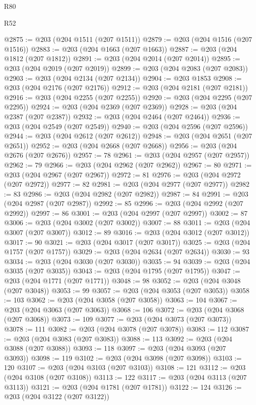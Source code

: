 \begin{lexlean}{R80}
\begin{lexlean}{R52}
\begin{coremodule}
{{{{{{{{{{{{{{{{{{{{{{{{{{{{{{{{{{{{{{{{{{{{{{{{{{{{{{{{{{{{{{{{{{{{{{{{{{{{{{{{{{{{{{{{{{{{{{{{{{{{{{{{{{{{{{{{{{{{{{{{{{{{{{{{{{{{{{{{{{{{{{{{{{{{{{{{{{{{{{{{{{{{{{{{{{{{{{{{{{{{{{{{{{{{{{{{{{{{{{@2875 := @203 (@204 @1511 (@207 @1511))
@2879 := @203 (@204 @1516 (@207 @1516))
@2883 := @203 (@204 @1663 (@207 @1663))
@2887 := @203 (@204 @1812 (@207 @1812))
@2891 := @203 (@204 @2014 (@207 @2014))
@2895 := @203 (@204 @2019 (@207 @2019))
@2899 := @203 (@204 @2083 (@207 @2083))
@2903 := @203 (@204 @2134 (@207 @2134))
@2904 := @203 @1853
@2908 := @203 (@204 @2176 (@207 @2176))
@2912 := @203 (@204 @2181 (@207 @2181))
@2916 := @203 (@204 @2255 (@207 @2255))
@2920 := @203 (@204 @2295 (@207 @2295))
@2924 := @203 (@204 @2369 (@207 @2369))
@2928 := @203 (@204 @2387 (@207 @2387))
@2932 := @203 (@204 @2464 (@207 @2464))
@2936 := @203 (@204 @2549 (@207 @2549))
@2940 := @203 (@204 @2596 (@207 @2596))
@2944 := @203 (@204 @2612 (@207 @2612))
@2948 := @203 (@204 @2651 (@207 @2651))
@2952 := @203 (@204 @2668 (@207 @2668))
@2956 := @203 (@204 @2676 (@207 @2676))
@2957 := 78
@2961 := @203 (@204 @2957 (@207 @2957))
@2962 := 79
@2966 := @203 (@204 @2962 (@207 @2962))
@2967 := 80
@2971 := @203 (@204 @2967 (@207 @2967))
@2972 := 81
@2976 := @203 (@204 @2972 (@207 @2972))
@2977 := 82
@2981 := @203 (@204 @2977 (@207 @2977))
@2982 := 83
@2986 := @203 (@204 @2982 (@207 @2982))
@2987 := 84
@2991 := @203 (@204 @2987 (@207 @2987))
@2992 := 85
@2996 := @203 (@204 @2992 (@207 @2992))
@2997 := 86
@3001 := @203 (@204 @2997 (@207 @2997))
@3002 := 87
@3006 := @203 (@204 @3002 (@207 @3002))
@3007 := 88
@3011 := @203 (@204 @3007 (@207 @3007))
@3012 := 89
@3016 := @203 (@204 @3012 (@207 @3012))
@3017 := 90
@3021 := @203 (@204 @3017 (@207 @3017))
@3025 := @203 (@204 @1757 (@207 @1757))
@3029 := @203 (@204 @2634 (@207 @2634))
@3030 := 93
@3034 := @203 (@204 @3030 (@207 @3030))
@3035 := 94
@3039 := @203 (@204 @3035 (@207 @3035))
@3043 := @203 (@204 @1795 (@207 @1795))
@3047 := @203 (@204 @1771 (@207 @1771))
@3048 := 98
@3052 := @203 (@204 @3048 (@207 @3048))
@3053 := 99
@3057 := @203 (@204 @3053 (@207 @3053))
@3058 := 103
@3062 := @203 (@204 @3058 (@207 @3058))
@3063 := 104
@3067 := @203 (@204 @3063 (@207 @3063))
@3068 := 106
@3072 := @203 (@204 @3068 (@207 @3068))
@3073 := 109
@3077 := @203 (@204 @3073 (@207 @3073))
@3078 := 111
@3082 := @203 (@204 @3078 (@207 @3078))
@3083 := 112
@3087 := @203 (@204 @3083 (@207 @3083))
@3088 := 113
@3092 := @203 (@204 @3088 (@207 @3088))
@3093 := 118
@3097 := @203 (@204 @3093 (@207 @3093))
@3098 := 119
@3102 := @203 (@204 @3098 (@207 @3098))
@3103 := 120
@3107 := @203 (@204 @3103 (@207 @3103))
@3108 := 121
@3112 := @203 (@204 @3108 (@207 @3108))
@3113 := 122
@3117 := @203 (@204 @3113 (@207 @3113))
@3121 := @203 (@204 @1781 (@207 @1781))
@3122 := 124
@3126 := @203 (@204 @3122 (@207 @3122))
}}}}}}}}}}}}}}}}}}}}}}}}}}}}}}}}}}}}}}}}}}}}}}}}}}}}}}}}}}}}}}}}}}}}}}}}}}}}}}}}}}}}}}}}}}}}}}}}}}}}}}}}}}}}}}}}}}}}}}}}}}}}}}}}}}}}}}}}}}}}}}}}}}}}}}}}}}}}}}}}}}}}}}}}}}}}}}}}}}}}}}}}}}}}}}}}}}}}}}
\end{coremodule}
\end{lexlean}
\end{lexlean}
